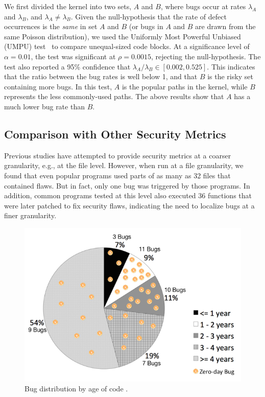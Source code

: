 We first divided the kernel into two sets,
$A$ and $B$, where bugs occur at rates $\lambda_A$ and
$\lambda_B$, and $\lambda_A \neq \lambda_B$. Given the null-hypothesis
that the rate of defect occurrences is the \textit{same} in set $A$ and $B$
(or bugs in $A$ and $B$ are drawn from the same Poisson distribution),
we used the Uniformly Most Powerful Unbiased (UMPU) test~\cite{shiue1982experiment}
to compare unequal-sized code blocks.
At a significance level of $\alpha=0.01$, the test was significant at
$\rho=0.0015$, rejecting the null-hypothesis.
The test also reported a 95\% confidence that $\lambda_A / \lambda_B
\in [0.002, 0.525]$. This indicates that the ratio between the bug rates is well
below 1, and that $B$ is the risky set containing more bugs.
In this test, $A$ is the popular paths in the kernel, while $B$
represents the less commonly-used paths. The above results show that
$A$ has a much lower bug rate than $B$.

\subsection{Comparison with Other Security Metrics}

Previous studies have attempted to provide security metrics at a coarser granularity,
e.g., at the file level. However, when run at a file
granularity, we found that even popular programs used parts of as many as
32 files that contained flaws. But in fact, only one bug was triggered by those programs.
In addition, common programs tested at this level also executed 36 functions
that were later patched to fix security
flaws, indicating the need to localize bugs at a finer granularity.

\begin{figure}
\centering
\includegraphics[width=1.0\columnwidth]{diagram/metrics_age.png}
\caption{\small Bug distribution by age of code \cite{ozment2006milk}.}
\label{fig:metrics_age}
\end{figure}

